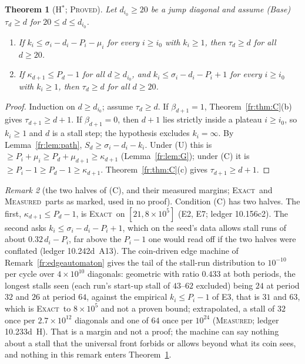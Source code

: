 \documentclass[11pt]{article}
\newtheorem{theorem}{Theorem}[section]
\theoremstyle{definition}
\theoremstyle{remark}
\newtheorem{remark}[theorem]{Remark}
\newcommand{\PROVED}{\textsc{Proved}}
\newcommand{\EXACT}{\textsc{Exact}}
\newcommand{\MEASURED}{\textsc{Measured}}
\begin{document}
\begin{theorem}[H$^*$; \PROVED]\label{fr:thm:Hstar}
Let $d_{i_0}\ge20$ be a jump diagonal and assume \textup{(Base)} $\tau_d\ge d$ for $20\le d\le d_{i_0}$.
\begin{enumerate}
\item[(U)] If $k_i\le\sigma_i-d_i-P_i-\mu_i$ for every $i\ge i_0$ with $k_i\ge1$, then $\tau_d\ge d$ for all $d\ge20$.
\item[(C)] If $\kappa_{d+1}\le P_d-1$ for all $d\ge d_{i_0}$, and $k_i\le\sigma_i-d_i-P_i+1$ for every
$i\ge i_0$ with $k_i\ge1$, then $\tau_d\ge d$ for all $d\ge20$.
\end{enumerate}
\end{theorem}
\begin{proof}
Induction on $d\ge d_{i_0}$; assume $\tau_d\ge d$. If $\beta_{d+1}=1$, Theorem~\ref{fr:thm:C}(b) gives
$\tau_{d+1}\ge d+1$. If $\beta_{d+1}=0$, then $d+1$ lies strictly inside a plateau $i\ge i_0$, so $k_i\ge1$ and
$d$ is a stall step; the hypothesis excludes $k_i=\infty$. By Lemma~\ref{fr:lem:path},
$S_d\ge\sigma_i-d_i-k_i$. Under (U) this is $\ge P_i+\mu_i\ge P_d+\mu_{d+1}\ge\kappa_{d+1}$
(Lemma~\ref{fr:lem:G}); under (C) it is $\ge P_i-1\ge P_d-1\ge\kappa_{d+1}$.
Theorem~\ref{fr:thm:C}(c) gives $\tau_{d+1}\ge d+1$.
\end{proof}

\begin{remark}[the two halves of (C), and their measured margins; \EXACT\ and \MEASURED\ parts as marked, used in no proof]\label{fr:Cmargin}
Condition (C) has two halves. The first, $\kappa_{d+1}\le P_d-1$, is \EXACT\ on $[21,8\times10^{5}]$ (E2, E7; ledger 10.156c2). The second asks $k_i\le\sigma_i-d_i-P_i+1$, which on the seed's data allows stall runs of about $0.32\,d_i-P_i$, far above the $P_i-1$ one would read off if the two halves were conflated (ledger 10.242d~A13). The coin-driven edge machine of Remark~\ref{fr:edgeautomaton} gives the tail of the stall-run distribution to $10^{-10}$ per cycle over $4\times10^{10}$ diagonals: geometric with ratio $0.433$ at both periods, the longest stalls seen (each run's start-up stall of $43$--$62$ excluded) being $24$ at period $32$ and $26$ at period $64$, against the empirical $k_i\le P_i-1$ of E3, that is $31$ and $63$, which is \EXACT\ to $8\times10^{5}$ and not a proven bound; extrapolated, a stall of $32$ once per $2.7\times10^{12}$ diagonals and one of $64$ once per $10^{24}$ (\MEASURED; ledger 10.233d~H). That is a margin and not a proof; the machine can say nothing about a stall that the universal front forbids or allows beyond what its coin sees, and nothing in this remark enters Theorem~\ref{fr:thm:Hstar}.
\end{remark}
\end{document}
